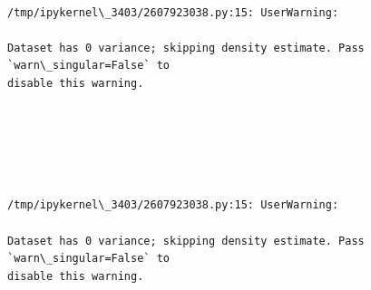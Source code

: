 \documentclass[11pt]{article}
\begin{document}
    \begin{center}
    \end{center}
    { \hspace*{\fill} \\}
    
    \begin{Verbatim}[commandchars=\\\{\}]
/tmp/ipykernel\_3403/2607923038.py:15: UserWarning:

Dataset has 0 variance; skipping density estimate. Pass `warn\_singular=False` to
disable this warning.

    \end{Verbatim}

    \begin{center}
    \end{center}
    { \hspace*{\fill} \\}
    
    \begin{center}
    \end{center}
    { \hspace*{\fill} \\}
    
    \begin{center}
    \end{center}
    { \hspace*{\fill} \\}
    
    \begin{Verbatim}[commandchars=\\\{\}]
/tmp/ipykernel\_3403/2607923038.py:15: UserWarning:

Dataset has 0 variance; skipping density estimate. Pass `warn\_singular=False` to
disable this warning.

    \end{Verbatim}

    \begin{center}
    \end{center}
    { \hspace*{\fill} \\}
    
\end{document}
